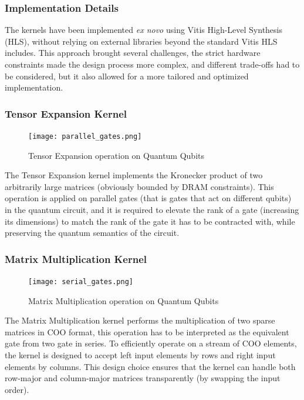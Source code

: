 \documentclass[12pt,oneside,a4paper]{article}
\begin{document}
\subsubsection{Implementation Details}

The kernels have been implemented \textit{ex novo} using Vitis High-Level Synthesis (HLS), without relying on external libraries beyond the standard Vitis HLS includes. This approach brought several challenges, the strict hardware constraints made the design process more complex, and different trade-offs had to be considered, but it also allowed for a more tailored and optimized implementation.

\subsubsection{Tensor Expansion Kernel} \label{tens_exp_section}

\begin{figure}[h]
    \centering
    \texttt{[image: parallel\_gates.png]}
    \caption{Tensor Expansion operation on Quantum Qubits}
    \label{fig:tensor-expansion}
\end{figure}

The Tensor Expansion kernel implements the Kronecker product of two arbitrarily large matrices (obviously bounded by DRAM constraints). This operation is applied on parallel gates (that is gates that act on different qubits) in the quantum circuit, and it is required to elevate the rank of a gate (increasing its dimensions) to match the rank of the gate it has to be contracted with, while preserving the quantum semantics of the circuit.

\subsubsection{Matrix Multiplication Kernel} \label{matmul_section}

\begin{figure}[h]
    \centering
    \texttt{[image: serial\_gates.png]}
    \caption{Matrix Multiplication operation on Quantum Qubits}
    \label{fig:matrix-multiplication}
\end{figure}

The Matrix Multiplication kernel performs the multiplication of two sparse matrices in COO format, this operation has to be interpreted as the equivalent gate from two gate in series. To efficiently operate on a stream of COO elements, the kernel is designed to accept left input elements by rows and right input elements by columns. This design choice ensures that the kernel can handle both row-major and column-major matrices transparently (by swapping the input order).
\end{document}
